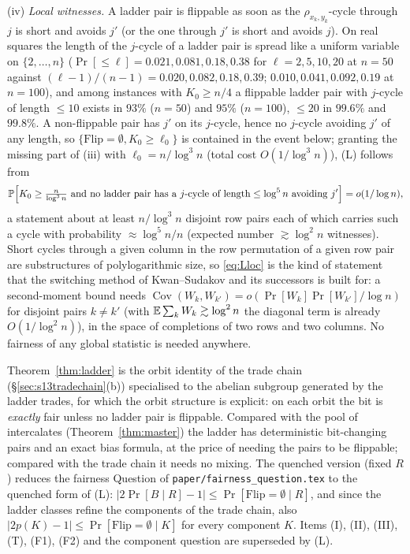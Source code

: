 \begin{remark}
(iv) \emph{Local witnesses.}  A ladder pair is flippable as soon as
the $\rho_{x_k,y_k}$-cycle through $j$ is short and avoids $j'$ (or
the one through $j'$ is short and avoids $j$).  On real squares the
length of the $j$-cycle of a ladder pair is spread like a uniform
variable on $\{2,\dots,n\}$ ($\Pr[\le\ell]=0.021,0.081,0.18,0.38$ for
$\ell=2,5,10,20$ at $n=50$ against $(\ell-1)/(n-1)=0.020,0.082,0.18,0.39$;
$0.010,0.041,0.092,0.19$ at $n=100$), and among instances with
$K_0\ge n/4$ a flippable ladder pair with $j$-cycle of length $\le10$
exists in $93\%$ ($n=50$) and $95\%$ ($n=100$), $\le20$ in $99.6\%$
and $99.8\%$.  A non-flippable pair has $j'$ on its $j$-cycle, hence
no $j$-cycle avoiding $j'$ of any length, so
$\{\mathrm{Flip}=\emptyset,K_0\ge\ell_0\}$ is contained in the event
below; granting the missing part of (iii) with $\ell_0=n/\log^3n$
(total cost $O(1/\log^3n)$), (L) follows from
\begin{equation}\label{eq:Lloc}
\Pr\Bigl[K_0\ge\tfrac n{\log^3n}\ \text{and no ladder pair has a
$j$-cycle of length}\le\log^5n\text{ avoiding }j'\Bigr]=o(1/\log n),
\end{equation}
a statement about at least $n/\log^3n$ disjoint row pairs each of
which carries such a cycle with probability $\approx\log^5n/n$
(expected number $\gtrsim\log^2n$ witnesses).  Short cycles through a given
column in the row permutation of a given row pair are substructures
of polylogarithmic size, so \eqref{eq:Lloc} is the kind of statement
that the switching method of Kwan--Sudakov \cite{KS18} and its
successors is built for: a second-moment bound needs
$\operatorname{Cov}(W_k,W_{k'})=o(\Pr[W_k]\Pr[W_{k'}]/\log n)$ for
disjoint pairs $k\ne k'$ (with $\E\sum_kW_k\gtrsim\log^2n$ the
diagonal term is already $O(1/\log^2 n)$), in the space of completions
of two rows and two columns.  No fairness of any global statistic is needed anywhere.
\end{remark}

\begin{remark}
Theorem~\ref{thm:ladder} is the orbit identity of the trade chain
(\S\ref{sec:s13tradechain}(b)) specialised to the abelian subgroup
generated by the ladder trades, for which the orbit structure is
explicit: on each orbit the bit is \emph{exactly} fair unless no ladder
pair is flippable.  Compared with the pool of intercalates
(Theorem~\ref{thm:master}) the ladder has deterministic bit-changing
pairs and an exact bias formula, at the price of needing the pairs
to be flippable; compared with the trade chain it needs no mixing.
The quenched version (fixed $R$) reduces the fairness Question of
\texttt{paper/fairness\_question.tex} to the quenched form of (L):
$|2\Pr[B\mid R]-1|\le\Pr[\mathrm{Flip}=\emptyset\mid R]$, and since the
ladder classes refine the components of the trade chain, also
$|2p(K)-1|\le\Pr[\mathrm{Flip}=\emptyset\mid K]$ for every component
$K$.  Items (I), (II), (III), (T),
(F1), (F2) and the component question are superseded by (L).
\end{remark}

